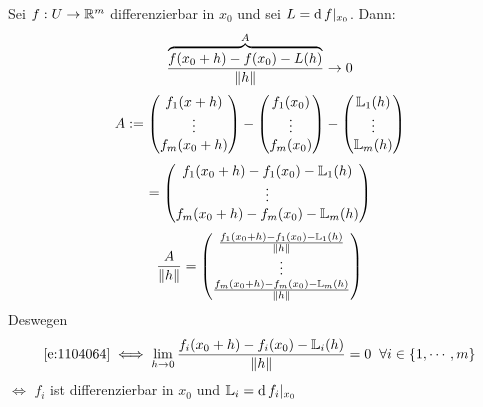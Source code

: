 \begin{Bem}
  Sei $f:U\rightarrow\mathbb{R}^m$ differenzierbar in $x_0$ und sei $L=\operatorname{d} f|_{x_0}$. Dann:
  \begin{equation}
    \label{e:1104064}
    \frac{\overbrace{f(x_0+h)-f(x_0)-L(h)}^A}{\left\| h \right\|}\rightarrow 0
  \end{equation}
  \[A:= \begin{pmatrix}
    f_1(x+h) \\ \vdots \\ f_m(x_0+h)
  \end{pmatrix} - \begin{pmatrix}
    f_1(x_0)\\ \vdots \\ f_m(x_0)
  \end{pmatrix} - \begin{pmatrix}
    \mathbb{L}_1(h) \\ \vdots \\ \mathbb{L}_m(h)
  \end{pmatrix}\]
  \[ = \begin{pmatrix}
    f_1(x_0+h)-f_1(x_0)-\mathbb{L}_1(h)\\
    \vdots \\
    f_m(x_0+h)-f_m(x_0)-\mathbb{L}_m(h)\\
  \end{pmatrix} \]
  \[\frac{A}{\left\| h \right\|}= \begin{pmatrix}
    \frac{f_1(x_0+h)-f_1(x_0)-\mathbb{L}_1(h)}{\left\| h \right\|} \\
    \vdots \\
    \frac{f_m(x_0+h)-f_m(x_0)-\mathbb{L}_m(h)}{\left\| h \right\|} \\
  \end{pmatrix}\]
  Deswegen
  \[\ref{e:1104064} \iff \displaystyle\lim_{h\rightarrow0}\frac{f_i(x_0+h)-f_i(x_0)-\mathbb{L}_i(h)}{\left\| h \right\|} = 0\hspace{2mm}\forall i\in \left\{ 1,\cdots,m \right\}\]
  $\iff$ $f_i$ ist differenzierbar in $x_0$ und $\mathbb{L}_i=\operatorname{d} f_i|_{x_0}$
\end{Bem}
